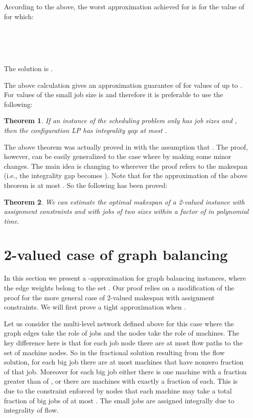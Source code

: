 \documentclass[11pt]{article}\usepackage{amsmath}
\newtheorem{theorem}{Theorem}[section]
\begin{document}
According to the above, the worst approximation achieved for  is for the value of  for which:

\begin{center}
\\
\\
\\
\end{center}


The solution is  .


 The above calculation  gives an approximation guarantee of  for values of  up to . For values of  the small job size is  and therefore it is preferable to use the following:

\begin{theorem}
\cite{svensson} If an instance of the scheduling problem only has job sizes  and , then the configuration LP has integrality gap at most .
\end{theorem}

The above theorem was actually proved in \cite{svensson} with the assumption that . The proof, however, can be easily generalized to the case where  by making some minor changes. The main idea is changing  to  wherever the proof refers to the makespan (i.e., the integrality gap becomes ).
Note that for  the approximation of the above theorem is at most . So the following has been proved:


\begin{theorem}
We can estimate the optimal makespan of a 2-valued  instance with  assignment constraints and with jobs of two sizes within a factor of  in polynomial time.
\end{theorem}



\section{2-valued case of graph balancing}

In this section we present a -approximation for graph balancing instances, where the edge weights belong to the set . Our proof relies on a modification of the proof for the more general case of 2-valued makespan with assignment constraints. We will first prove a tight  approximation when .


Let us  consider the multi-level  network defined above for  this case
where the graph edges take  the role of jobs and the nodes  take the role of
machines. The key difference here is  that for each job node there are
at  most   flow  paths  to the  set  of machine  nodes.  So in  the
fractional solution resulting from the flow solution, for each big job
 there are at most   machines that have nonzero fraction of that
job. Moreover  for each  big job  either there is  one machine  with a
fraction greater  than   of , or  there are   machines with
exactly a   fraction of  each. This is  due to the constraint
enforced by nodes  that each machine may take a total fraction of
big jobs of at most . The small jobs are assigned integrally due to
integrality of flow.
\end{document}
